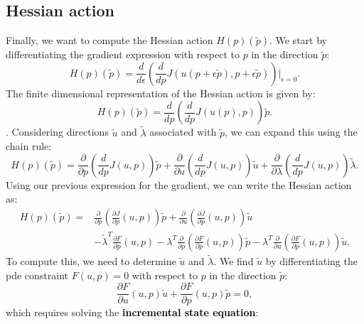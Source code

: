 \subsection{Hessian action}
Finally, we want to compute the Hessian action $H(p)(\tilde{p})$. We start by differentiating the gradient expression with respect to $p$ in the direction $\tilde{p}$:
\begin{equation}
        H(p)(\tilde{p}) = \frac{d}{d\epsilon}\left(\frac{d}{dp}J(u(p+\epsilon \tilde{p}),p+\epsilon \tilde{p})\right)\Bigg\vert_{\epsilon=0}.
\end{equation}
The finite dimensional representation of the Hessian action is given by:
\begin{equation}
    H(p)(\tilde{p}) = \frac{d}{dp}\left(\frac{d}{dp}J(u(p),p)\right)\tilde{p}.
\end{equation}.
Considering directions $\tilde{u}$ and $\tilde{\lambda}$ associated with $\tilde{p}$, we can expand this using the chain rule:
\begin{equation}
    H(p)(\tilde{p}) = \frac{\partial}{\partial p} \left(\frac{d}{dp}J(u,p)\right)\tilde{p} + \frac{\partial}{\partial u} \left(\frac{d}{dp}J(u,p)\right)\tilde{u} + \frac{\partial}{\partial \lambda} \left(\frac{d}{dp}J(u,p)\right)\tilde{\lambda}.
\end{equation}
Using our previous expression for the gradient, we can write the Hessian action as:
\begin{equation}\begin{aligned}
    H(p)(\tilde{p}) = 
    &\frac{\partial}{\partial p} \left(\frac{\partial J}{\partial p}(u,p)\right)\tilde{p} +\frac{\partial}{\partial u} \left(\frac{\partial J}{\partial p}(u,p)\right)\tilde{u} \\
    &- \tilde{\lambda}^T \frac{\partial F}{\partial p}(u,p) - \lambda^T \frac{\partial}{\partial p}\left(\frac{\partial F}{\partial p}(u,p)\right)\tilde{p} - \lambda^T \frac{\partial}{\partial u}\left(\frac{\partial F}{\partial p}(u,p)\right)\tilde{u}.
    \end{aligned}
\end{equation}
To compute this, we need to determine $\tilde{u}$ and $\tilde{\lambda}$. We find $\tilde{u}$ by differentiating the pde constraint $F(u,p) = 0$ with respect to $p$ in the direction $\tilde{p}$:
\begin{equation}
    \frac{\partial F}{\partial u}(u,p) \tilde{u} + \frac{\partial F}{\partial p}(u,p) \tilde{p} = 0,
\end{equation}
which requires solving the \textcolor{black}{\textbf{incremental state equation}}:
